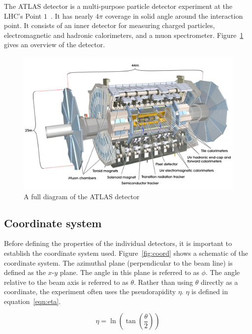The ATLAS detector is a multi-purpose particle detector experiment at the LHC's Point $1$~\cite{ATLASPaper}. It has nearly $4\pi$ coverage in solid angle around the interaction point. It consists of an inner detector for measuring charged particles, electromagnetic and hadronic calorimeters, and a muon spectrometer. Figure~\ref{fig:ATLAS_overview} gives an overview of the detector.

\begin{figure}[h!]
  \centering
  \captionsetup{justification=centering}

  \includegraphics[width=\textwidth]{figures/ATLAS}
   \caption{A full diagram of the ATLAS detector~\cite{ATLASPaper}}
  \label{fig:ATLAS_overview}
\end{figure}

\subsection{Coordinate system}

Before defining the properties of the individual detectors, it is important to establish the coordinate system used. Figure~\ref{fig:coord} shows a schematic of the coordinate system. The azimuthal plane (perpendicular to the beam line) is defined as the $x$-$y$ plane. The angle in this plane is referred to as $\phi$. The angle relative to the beam axis is referred to as $\theta$. Rather than using $\theta$ directly as a coordinate, the experiment often uses the pseudorapidity $\eta$. $\eta$ is defined in equation~\ref{eqn:eta}. 

\begin{equation}
\label{eqn:eta}
\eta = \ln{\left(\tan\left(\frac{\theta}{2}\right)\right)}
\end{equation}

